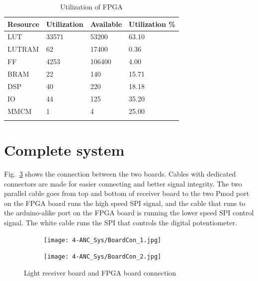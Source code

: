 \begin{longtable}[c]{|l|l|l|l|}
\hline
\textbf{Resource} & \textbf{Utilization} & \textbf{Available} & \textbf{Utilization \%} \\ \hline
\endhead
%
\rowcolor[HTML]{FFFFFF} 
LUT & 33571 & 53200 & 63.10 \\ \hline
\rowcolor[HTML]{FFFFFF} 
LUTRAM & 62 & 17400 & 0.36 \\ \hline
\rowcolor[HTML]{FFFFFF} 
FF & 4253 & 106400 & 4.00 \\ \hline
\rowcolor[HTML]{FFFFFF} 
BRAM & 22 & 140 & 15.71 \\ \hline
\rowcolor[HTML]{FFFFFF} 
DSP & 40 & 220 & 18.18 \\ \hline
\rowcolor[HTML]{FFFFFF} 
IO & 44 & 125 & 35.20 \\ \hline
\rowcolor[HTML]{FFFFFF} 
MMCM & 1 & 4 & 25.00 \\ \hline
\caption{Utilization of FPGA}
\label{tab_FPGAUtilSimple}\\
\end{longtable}

\section{Complete system}

Fig.~\ref{fig_BoardCon} shows the connection between the two boards.  Cables with dedicated connectors are made for easier connecting and better signal integrity.  The two parallel cable goes from top and bottom of receiver board to the two Pmod port on the FPGA board runs the high speed SPI signal, and the cable that runs to the arduino-alike port on the FPGA board is running the lower speed SPI control signal.  The white cable runs the SPI that controls the digital potentiometer.



\begin{figure}[h]
\centering
\begin{subfigure}{.5\textwidth}
  \centering
  \texttt{[image: 4-ANC\_Sys/BoardCon\_1.jpg]}
  \caption{}
  \label{fig_BoardCon_1}
\end{subfigure}%
\begin{subfigure}{.5\textwidth}
  \centering
  \texttt{[image: 4-ANC\_Sys/BoardCon\_2.jpg]}
  \caption{}
  \label{fig_BoardCon_2}
\end{subfigure}
\caption{Light receiver board and FPGA board connection}
\label{fig_BoardCon}
\end{figure}


